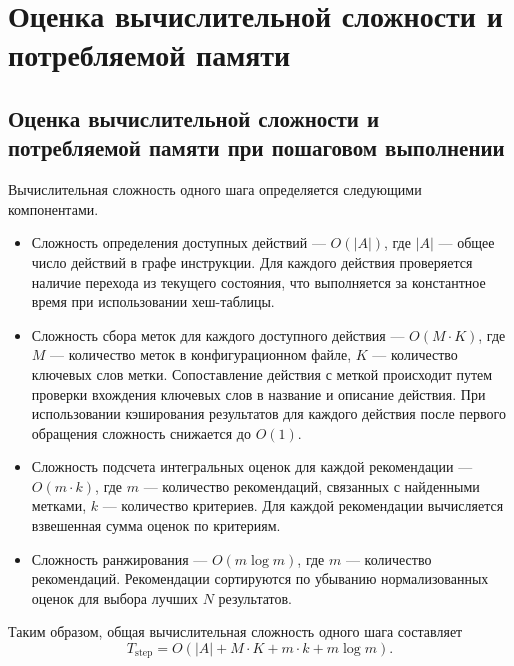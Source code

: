 
\section{Оценка вычислительной сложности и потребляемой памяти}

\subsection*{Оценка вычислительной сложности и потребляемой памяти при пошаговом выполнении}

Вычислительная сложность одного шага определяется следующими компонентами.

\begin{itemize}
    \item Сложность определения доступных действий --- \(O(|A|)\), где \(|A|\) --- общее число действий в графе инструкции. Для каждого действия проверяется наличие перехода из текущего состояния, что выполняется за константное время при использовании хеш-таблицы.
    \item Сложность сбора меток для каждого доступного действия --- \(O(M \cdot K)\), где \(M\) --- количество меток в конфигурационном файле, \(K\) --- количество ключевых слов метки. Сопоставление действия с меткой происходит путем проверки вхождения ключевых слов в название и описание действия. При использовании кэширования результатов для каждого действия после первого обращения сложность снижается до \(O(1)\).
    \item Сложность подсчета интегральных оценок для каждой рекомендации --- \(O(m \cdot k)\), где \(m\) --- количество рекомендаций, связанных с найденными метками, \(k\) --- количество критериев. Для каждой рекомендации вычисляется взвешенная сумма оценок по критериям.
    \item Сложность ранжирования --- \(O(m \log m)\), где \(m\) --- количество рекомендаций. Рекомендации сортируются по убыванию нормализованных оценок для выбора лучших $N$ результатов.
\end{itemize}

Таким образом, общая вычислительная сложность одного шага составляет
\begin{equation}
    T_{\text{step}} = O(|A| + M \cdot K + m \cdot k + m \log m).
    \label{eq:vichisl}
\end{equation}


